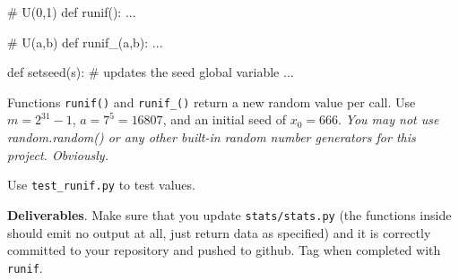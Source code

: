 \begin{fullwidth}
\begin{pyverbatim}
# U(0,1)
def runif():
    ...

# U(a,b)
def runif_(a,b):
    ...

def setseed(s): # updates the seed global variable
    ...
\end{pyverbatim}

Functions {\tt runif()} and {\tt runif\_()} return a new random value per call. Use $m = 2^{31} - 1$, $a = 7^5 = 16807$, and an initial seed of $x_0 = 666$.  {\em You may not use random.random() or any other built-in random number generators for this project.  Obviously.}

Use {\tt test\_runif.py} to test values.

\begin{callout}{\bcplume}
{\bf Deliverables}. Make sure that you update {\tt stats/stats.py} (the functions inside should emit no output at all, just return data as specified) and it is correctly committed to your repository and pushed to github. Tag when completed with {\tt runif}.
\end{callout}

\end{fullwidth}
